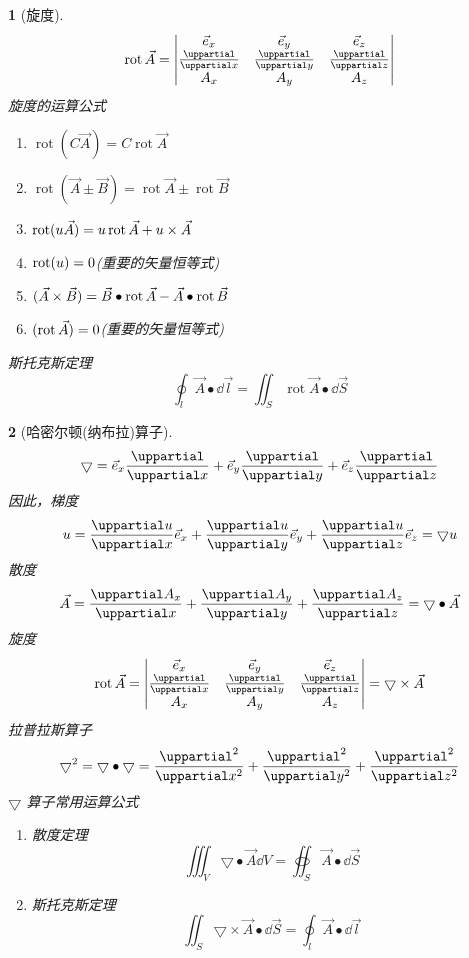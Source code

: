 \documentclass{book}
\theoremstyle{change}
\newtheorem{ti}{}[section]
\let\div\relax\let\grad\relax
\DeclareMathOperator{\div}{div}
\DeclareMathOperator{\grad}{grad}
\DeclareMathOperator{\rot}{rot}
\def\partial{\uppartial}
\begin{document}
\begin{ti}[旋度]
	\[
	\rot\vec{A}=
	\begin{vmatrix}
	\vec e_x&\vec e_y&\vec e_z\\
	\frac{\partial}{\partial x}&\frac{\partial}{\partial y}&\frac{\partial}{\partial z}\\
	A_x&A_y&A_z
	\end{vmatrix}
	\]
	旋度的运算公式
	\begin{enumerate}
		\item $\rot(C\vec{A})=C\rot\vec{A}$
		\item $\rot(\vec{A}\pm\vec{B})=\rot\vec{A}\pm\rot\vec{B}$
		\item $\rot(u\vec{A})=u\rot\vec{A}+\grad u\times\vec{A}$
		\item $\rot(\grad u)=0$(重要的矢量恒等式)
		\item $\div(\vec{A}\times\vec{B})=\vec{B}\bullet\rot\vec{A}-\vec{A}\bullet\rot\vec{B}$
		\item $\div(\rot\vec{A})=0$(重要的矢量恒等式)
	\end{enumerate}
	斯托克斯定理
	\[
		\oint_l{\vec{A}\bullet\dd \vec{l}}=\iint_S{\rot\vec{A}\bullet\dd \vec{S}}
	\]
\end{ti}

\begin{ti}[哈密尔顿(纳布拉)算子]
	\[
		\bigtriangledown=\vec{e}_x\frac{\partial}{\partial x}+\vec{e}_y\frac{\partial}{\partial y}+\vec{e}_z\frac{\partial}{\partial z}
	\]
	因此，梯度
	\[
		\grad u=\frac{\partial u}{\partial x}\vec{e}_x+\frac{\partial u}{\partial y}\vec{e}_y+\frac{\partial u}{\partial z}\vec{e}_z=\bigtriangledown u
	\]
	散度
	\[
		\div\vec A=\frac{\partial A_x}{\partial x}+\frac{\partial A_y}{\partial y}+\frac{\partial A_z}{\partial z}=\bigtriangledown\bullet\vec{A}
	\]
	旋度
	\[
		\rot\vec{A}=
	\begin{vmatrix}
	\vec e_x&\vec e_y&\vec e_z\\
	\frac{\partial}{\partial x}&\frac{\partial}{\partial y}&\frac{\partial}{\partial z}\\
	A_x&A_y&A_z
	\end{vmatrix}=\bigtriangledown\times\vec{A}
	\]
	拉普拉斯算子
	\[
		\bigtriangledown^2=\bigtriangledown\bullet\bigtriangledown=\frac{\partial^2}{\partial x^2}+\frac{\partial^2}{\partial y^2}+\frac{\partial^2}{\partial z^2}
	\]
	$\bigtriangledown$ 算子常用运算公式
	\begin{enumerate}
		\item 散度定理
		\[
			\iiint_{V}{\bigtriangledown\bullet\vec{A}}\dd V=\oiint_{S}{\vec{A}\bullet\dd \vec{S}}
		\]
		\item 斯托克斯定理
		\[
			\iint_S{\bigtriangledown\times\vec{A}\bullet\dd \vec{S}}=\oint_l{\vec{A}\bullet\dd \vec{l}}
		\]
	\end{enumerate}
\end{ti}
\end{document}
